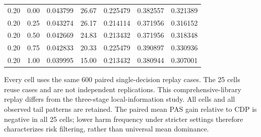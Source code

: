 \documentclass[10pt]{article}
\makeatletter
\newcommand{\tablefoot}[1]{\par\vspace{3pt}\begin{minipage}{\linewidth}\footnotesize #1\end{minipage}}
\newenvironment{exporttable}{\par\noindent\begin{minipage}{\linewidth}\def\@captype{table}}{\end{minipage}\par}
\makeatother
\begin{document}
\begin{exporttable}
\begin{tabularx}{\linewidth}{YYrrrrr}
0.20 & 0.00 & 0.043799 & 26.67 & 0.225479 & 0.382557 & 0.321389\\
0.20 & 0.25 & 0.043274 & 26.17 & 0.214114 & 0.371956 & 0.316152\\
0.20 & 0.50 & 0.042669 & 24.83 & 0.213432 & 0.371956 & 0.318348\\
0.20 & 0.75 & 0.042833 & 20.33 & 0.225479 & 0.390897 & 0.330936\\
0.20 & 1.00 & 0.039995 & 15.00 & 0.213432 & 0.380944 & 0.307001\\
\bottomrule\end{tabularx}\tablefoot{Every cell uses the same 600 paired single-decision replay cases. The 25 cells reuse cases and are not independent replications. This comprehensive-library replay differs from the three-stage local-information study. All cells and all observed tail patterns are retained. The paired mean PAS gain relative to CDP is negative in all 25 cells; lower harm frequency under stricter settings therefore characterizes risk filtering, rather than universal mean dominance.}
\end{exporttable}
\clearpage
\setcounter{table}{12}
\end{document}
